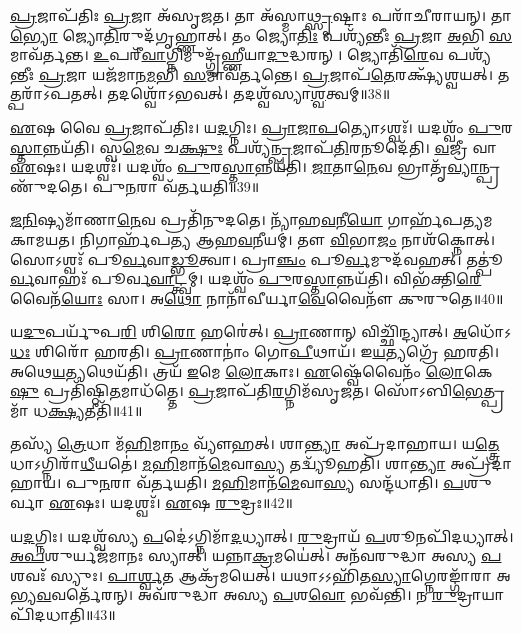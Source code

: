 \-\ul{𑌪𑍍𑌰}\-𑌜𑌾\-𑌪᳴𑌤𑌿𑌃 \ul{𑌪𑍍𑌰}\-𑌜𑌾 𑌅᳴\-𑌸𑍃𑌜𑌤।
𑌤𑌾 𑌅᳴𑌸𑍍𑌮𑌾\-\ul{𑌥𑍍𑌸𑍃}\-𑌷𑍍𑌟𑌾𑌃 𑌪𑌰𑌾᳴𑌚𑍀𑌰𑌾𑌯𑌨𑍍।
𑌤𑌾\-\ul{𑌭𑍍𑌯𑍋} 𑌜𑍍𑌯𑍋\-\ul{𑌤𑌿}\-𑌰𑍁𑌦᳴𑌗𑍃𑌹𑍍𑌣𑌾𑌤𑍍।
𑌤𑌂 𑌜𑍍𑌯𑍋\-\ul{𑌤𑌿𑌃} 𑌪𑌶𑍍𑌯᳴𑌨𑍍𑌤𑍀𑌃 \ul{𑌪𑍍𑌰}\-𑌜𑌾 \ul{𑌅}\-𑌭𑌿 \ul{𑌸}\-𑌮𑌾𑌵᳴𑌰𑍍𑌤𑌨𑍍𑌤।
\-\ul{𑌉}\-𑌪𑌰𑍀᳴\-\ul{𑌵𑌾}\-𑌗𑍍𑌨𑌿𑌮𑍁𑌦𑍍𑌗𑍃᳴𑌹𑍍𑌣𑍀𑌯𑌾\-\ul{𑌦𑍁}\-𑌦𑍍𑌧𑌰𑌨𑍍।
𑌜𑍍𑌯𑍋𑌤𑌿᳴\-\ul{𑌰𑍇}\-𑌵 𑌪𑌶𑍍𑌯᳴𑌨𑍍𑌤𑍀𑌃 \ul{𑌪𑍍𑌰}\-𑌜𑌾 𑌯𑌜᳴𑌮𑌾𑌨\-\ul{𑌮}\-𑌭𑌿 \ul{𑌸}\-𑌮𑌾𑌵᳴𑌰𑍍𑌤𑌨𑍍𑌤𑍇।
\-\ul{𑌪𑍍𑌰}\-𑌜𑌾𑌪᳴\-\ul{𑌤𑍇}\-𑌰𑌕𑍍𑌷𑍍𑌯᳴𑌶𑍍𑌵𑌯𑌤𑍍।
𑌤𑌤𑍍𑌪𑌰𑌾᳴\-𑌽𑌪𑌤𑌤𑍍।
𑌤𑌦𑌶𑍍𑌵𑍋᳴\-𑌽𑌭𑌵𑌤𑍍।
𑌤𑌦𑌶𑍍𑌵᳴𑌸𑍍𑌯𑌾\-\ul{𑌶𑍍𑌵}\-𑌤𑍍𑌵𑌮𑍍॥38॥

\-\ul{𑌏}\-𑌷 𑌵𑍈 \ul{𑌪𑍍𑌰}\-𑌜𑌾\-𑌪᳴𑌤𑌿𑌃।
𑌯\-\ul{𑌦}\-𑌗𑍍𑌨𑌿𑌃।
\-\ul{𑌪𑍍𑌰𑌾}\-\-\ul{𑌜𑌾}\-\-\ul{𑌪}\-𑌤𑍍𑌯𑍋\-𑌽𑌶𑍍𑌵𑌃᳴।
𑌯𑌦𑌶𑍍𑌵𑌂᳴ \ul{𑌪𑍁}\-𑌰\-\ul{𑌸𑍍𑌤𑌾}\-𑌨𑍍𑌨𑌯᳴𑌤𑌿।
𑌸𑍍𑌵\-\ul{𑌮𑍇}\-𑌵 𑌚\-\ul{𑌕𑍍𑌷𑍁𑌃} 𑌪𑌶𑍍𑌯᳴\-\ul{𑌨𑍍𑌪𑍍𑌰}\-𑌜𑌾𑌪᳴\-\ul{𑌤𑌿}\-𑌰𑌨𑍂𑌦𑍇᳴𑌤𑌿।
\-\ul{𑌵}\-𑌜𑍍𑌰𑍀 𑌵𑌾 \ul{𑌏}\-𑌷𑌃।
𑌯𑌦𑌶𑍍𑌵𑌃᳴।
𑌯𑌦𑌶𑍍𑌵𑌂᳴ \ul{𑌪𑍁}\-𑌰\-\ul{𑌸𑍍𑌤𑌾}\-𑌨𑍍𑌨𑌯᳴𑌤𑌿।
\-\ul{𑌜𑌾}\-𑌤𑌾\-\ul{𑌨𑍇}\-𑌵 𑌭𑍍𑌰𑌾𑌤𑍃᳴\-\ul{𑌵𑍍𑌯𑌾}\-𑌨𑍍𑌪𑍍𑌰𑌣𑍁᳴𑌦𑌤𑍇।
𑌪𑍁\-\ul{𑌨}\-𑌰𑌾 𑌵᳴𑌰𑍍𑌤𑌯𑌤𑌿॥39॥

\-\ul{𑌜}\-\-\ul{𑌨𑌿}\-𑌷𑍍𑌯𑌮𑌾᳴𑌣𑌾\-\ul{𑌨𑍇}\-𑌵 𑌪𑍍𑌰𑌤𑌿᳴\-𑌨𑍁𑌦𑌤𑍇।
𑌨𑍍𑌯𑌾᳴𑌹\-\ul{𑌵}\-𑌨𑍀\-\ul{𑌯𑍋} 𑌗𑌾𑌰𑍍\mbox{}𑌹᳴𑌪𑌤𑍍𑌯\-𑌮𑌕𑌾𑌮𑌯𑌤।
𑌨𑌿𑌗𑌾𑌰𑍍\mbox{}𑌹᳴𑌪𑌤𑍍𑌯 𑌆𑌹\-\ul{𑌵}\-𑌨𑍀𑌯𑌮𑍍॑।
𑌤𑍗 \ul{𑌵𑌿}\-𑌭𑌾\-\ul{𑌜𑌂} 𑌨𑌾𑌶᳴𑌕𑍍𑌨𑍋𑌤𑍍।
𑌸𑍋𑌽𑌶𑍍𑌵𑌃᳴ 𑌪𑍂\-\ul{𑌰𑍍𑌵}\-𑌵𑌾\-\ul{𑌡𑍍𑌭𑍂}\-𑌤𑍍𑌵𑌾।
𑌪𑍍𑌰𑌾\-\ul{𑌞𑍍𑌚𑌂} 𑌪𑍂\-\ul{𑌰𑍍𑌵}\-𑌮𑍁𑌦᳴𑌵𑌹𑌤𑍍।
𑌤𑌤𑍍𑌪𑍂॑\-\ul{𑌰𑍍𑌵}\-𑌵𑌾𑌹𑌃᳴ 𑌪𑍂𑌰𑍍𑌵\-\ul{𑌵𑌾}\-𑌟𑍍𑌤𑍍𑌵𑌮𑍍।
𑌯𑌦𑌶𑍍𑌵𑌂᳴ \ul{𑌪𑍁}\-𑌰\-\ul{𑌸𑍍𑌤𑌾}\-𑌨𑍍𑌨𑌯᳴𑌤𑌿।
𑌵𑌿𑌭᳴𑌕𑍍𑌤𑌿\-\-\ul{𑌰𑍇}\-𑌵𑍈𑌨᳴\-\ul{𑌯𑍋𑌃} 𑌸𑌾।
𑌅\-\ul{𑌥𑍋} 𑌨𑌾𑌨𑌾᳴𑌵𑍀𑌰𑍍𑌯𑌾\-\ul{𑌵𑍇}\-𑌵𑍈𑌨𑍗᳴ 𑌕𑍁𑌰𑍁𑌤𑍇॥40॥

𑌯\-\ul{𑌦𑍁}\-𑌪𑌰𑍍𑌯𑍁᳴𑌪\-\ul{𑌰𑌿} 𑌶𑌿\-\ul{𑌰𑍋} 𑌹𑌰𑍇॑𑌤𑍍।
\-\ul{𑌪𑍍𑌰𑌾}\-𑌣𑌾𑌨𑍍‌ 𑌵𑌿𑌚𑍍𑌛𑌿᳴𑌨𑍍𑌦𑍍𑌯𑌾𑌤𑍍।
\-\ul{𑌅}\-𑌧𑍋᳴𑌽\-\ul{𑌧𑌃} 𑌶𑌿𑌰𑍋᳴ 𑌹𑌰𑌤𑌿।
\-\ul{𑌪𑍍𑌰𑌾}\-𑌣𑌾𑌨𑌾𑌂॑ 𑌗𑍋\-\ul{𑌪𑍀}\-𑌥𑌾𑌯᳴।
𑌇\-\ul{𑌯}\-𑌤𑍍𑌯𑌗𑍍𑌰𑍇᳴ 𑌹𑌰𑌤𑌿।
𑌅𑌥𑍇\-\ul{𑌯}\-𑌤𑍍𑌯𑌥𑍇𑌯᳴𑌤𑌿।
𑌤𑍍𑌰𑌯᳴ \ul{𑌇}\-𑌮𑍇 \ul{𑌲𑍋}\-𑌕𑌾𑌃।
\-\ul{𑌏}\-𑌷𑍍𑌵𑍇᳴𑌵𑍈𑌨𑌂᳴ \ul{𑌲𑍋}\-𑌕𑍇\-\ul{𑌷𑍁} 𑌪𑍍𑌰𑌤𑌿᳴\-𑌷𑍍𑌠𑌿\-\ul{𑌤}\-𑌮𑌾𑌧᳴𑌤𑍍𑌤𑍇।
\-\ul{𑌪𑍍𑌰}\-𑌜𑌾𑌪᳴𑌤𑌿\-\ul{𑌰}\-𑌗𑍍𑌨𑌿𑌮᳴\-𑌸𑍃𑌜𑌤।
𑌸𑍋᳴𑌽𑌬𑌿\-\ul{𑌭𑍇}\-𑌤𑍍𑌪𑍍𑌰 𑌮𑌾᳴ 𑌧\-\ul{𑌕𑍍𑌷𑍍𑌯}\-𑌤𑍀𑌤𑌿᳴॥41॥

𑌤𑌸𑍍𑌯᳴ \ul{𑌤𑍍𑌰𑍇}\-𑌧𑌾 𑌮᳴\-\ul{𑌹𑌿}\-𑌮𑌾\-\ul{𑌨𑌂} 𑌵𑍍𑌯𑍗᳴𑌹𑌤𑍍।
𑌶𑌾\-\ul{𑌨𑍍𑌤𑍍𑌯𑌾} 𑌅𑌪𑍍𑌰᳴𑌦𑌾𑌹𑌾𑌯।
𑌯\-\ul{𑌤𑍍𑌤𑍍𑌰𑍇}\-𑌧𑌾\-𑌽𑌗𑍍𑌨𑌿𑌰𑌾᳴\-\ul{𑌧𑍀}\-𑌯𑌤𑍇॑।
\-\ul{𑌮}\-\-\ul{𑌹𑌿}\-𑌮𑌾𑌨᳴\-\ul{𑌮𑍇}\-𑌵𑌾\-\ul{𑌸𑍍𑌯} 𑌤𑌦𑍍𑌵𑍍𑌯𑍂᳴𑌹𑌤𑌿।
𑌶𑌾\-\ul{𑌨𑍍𑌤𑍍𑌯𑌾} 𑌅𑌪𑍍𑌰᳴𑌦𑌾𑌹𑌾𑌯।
𑌪𑍁\-\ul{𑌨}\-𑌰𑌾 𑌵᳴𑌰𑍍𑌤𑌯𑌤𑌿।
\-\ul{𑌮}\-\-\ul{𑌹𑌿}\-𑌮𑌾𑌨᳴\-\ul{𑌮𑍇}\-𑌵𑌾\-\ul{𑌸𑍍𑌯} 𑌸𑌨𑍍𑌦᳴𑌧𑌾𑌤𑌿।
\-\ul{𑌪}\-𑌶𑍁𑌰𑍍𑌵𑌾 \ul{𑌏}\-𑌷𑌃।
𑌯𑌦𑌶𑍍𑌵𑌃᳴।
\-\ul{𑌏}\-𑌷 \ul{𑌰𑍁}\-𑌦𑍍𑌰𑌃॥42॥

𑌯\-\ul{𑌦}\-𑌗𑍍𑌨𑌿𑌃।
𑌯𑌦𑌶𑍍𑌵᳴𑌸𑍍𑌯 \ul{𑌪}\-𑌦𑍇॑\-𑌽𑌗𑍍𑌨𑌿𑌮𑌾᳴\-\ul{𑌦}\-𑌧𑍍𑌯𑌾𑌤𑍍।
\-\ul{𑌰𑍁}\-𑌦𑍍𑌰𑌾𑌯᳴ \ul{𑌪}\-𑌶𑍂𑌨𑌪𑌿᳴\-𑌦𑌧𑍍𑌯𑌾𑌤𑍍।
\-\ul{𑌅}\-\-\ul{𑌪}\-𑌶𑍁𑌰𑍍𑌯𑌜᳴𑌮𑌾𑌨𑌃 𑌸𑍍𑌯𑌾𑌤𑍍।
𑌯𑌨𑍍𑌨𑌾\-\ul{𑌕𑍍𑌰}\-𑌮𑌯𑍇॑𑌤𑍍।
𑌅𑌨᳴𑌵𑌰𑍁𑌦𑍍𑌧𑌾 𑌅𑌸𑍍𑌯 \ul{𑌪}\-𑌶𑌵𑌃᳴ 𑌸𑍍𑌯𑍁𑌃।
\-\ul{𑌪𑌾}\-\-\ul{𑌰𑍍𑌶𑍍𑌵}\-𑌤 𑌆𑌕𑍍𑌰᳴𑌮𑌯𑍇𑌤𑍍।
𑌯𑌥𑌾𑌽𑌽𑌹𑌿᳴𑌤\-\ul{𑌸𑍍𑌯𑌾}\-𑌗𑍍𑌨𑍇𑌰𑌙𑍍𑌗𑌾᳴𑌰𑌾 𑌅𑌭𑍍𑌯\-\ul{𑌵}\-𑌵𑌰𑍍𑌤𑍇᳴𑌰𑌨𑍍।
𑌅𑌵᳴𑌰𑍁𑌦𑍍𑌧𑌾 𑌅𑌸𑍍𑌯 \ul{𑌪}\-𑌶\-\ul{𑌵𑍋} 𑌭𑌵᳴𑌨𑍍𑌤𑌿।
𑌨 \ul{𑌰𑍁}\-𑌦𑍍𑌰𑌾𑌯𑌾𑌪𑌿᳴𑌦𑌧𑌾𑌤𑌿॥43॥

